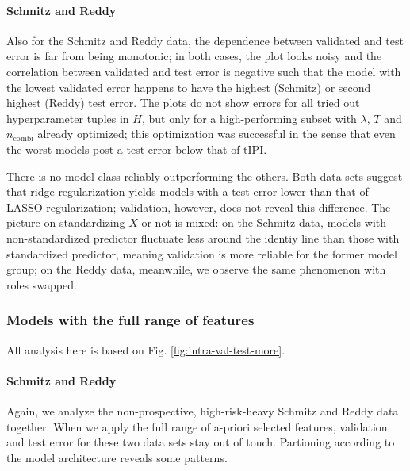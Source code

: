 \paragraph{Schmitz and Reddy}
Also for the Schmitz and Reddy data, the dependence between validated and test error is far from 
being monotonic; in both cases, the plot looks noisy and the correlation between validated and test 
error is negative such that the model with the lowest validated error happens to have the highest 
(Schmitz) or second highest (Reddy) test error. The plots do not show errors for all tried out 
hyperparameter tuples in $H$, but only for a high-performing subset with $\lambda$, $T$ and 
$n_\text{combi}$ already 
optimized; this optimization was successful in the sense that even the worst models post a test 
error below that of $\text{tIPI}$.

There is no model class reliably outperforming the others. Both data sets suggest that ridge 
regularization yields models with a test error lower than that of LASSO regularization; validation, 
however, does not reveal this difference. The picture on standardizing $X$ or not is mixed: on the 
Schmitz data, models with non-standardized predictor fluctuate less around the identiy line than 
those with standardized predictor, meaning validation is more reliable for the former model group;
on the Reddy data, meanwhile, we observe the same phenomenon with roles swapped.

\subsubsection{Models with the full range of features}



All analysis here is based on Fig. \ref{fig:intra-val-test-more}.

\paragraph{Schmitz and Reddy}
Again, we analyze the non-prospective, high-risk-heavy Schmitz and Reddy data together. When we apply
the full range of a-priori selected features, validation and test error for these two data sets 
stay out of touch. Partioning according to the model architecture reveals some patterns. 

